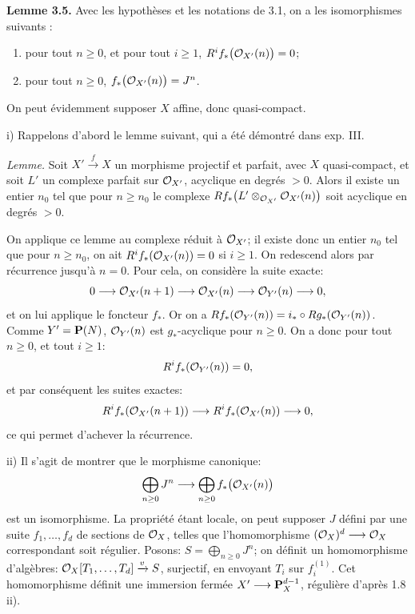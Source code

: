 \textbf{Lemme 3.5.} Avec les hypothèses et les notations de 3.1, on a les isomorphismes suivants :
\begin{enumerate}[label=\roman*)]
\item pour tout \(n\ge0\), et pour tout \(i\ge1\), \(R^if_*\bigl(\mathcal O_{X'}(n)\bigr)=0\);
\item pour tout \(n\ge0\), \(f_*\bigl(\mathcal O_{X'}(n)\bigr)=J^n\).
\end{enumerate}
On peut évidemment supposer \(X\) affine, donc quasi-compact.

i) Rappelons d'abord le lemme suivant, qui a été démontré dans exp. III.

\textit{Lemme.} Soit \(X'\xrightarrow{f}X\) un morphisme projectif et parfait, avec \(X\) quasi-compact, et soit \(L'\) un complexe parfait sur \(\mathcal O_{X'}\), acyclique en degrés \(>0\). Alors il existe un entier \(n_0\) tel que pour \(n\ge n_0\) le complexe \(Rf_*\bigl(L'\otimes_{\mathcal O_{X'}}\mathcal O_{X'}(n)\bigr)\) soit acyclique en degrés \(>0\).

On applique ce lemme au complexe réduit à \(\mathcal O_{X'}\); il existe donc un entier \(n_0\) tel que pour \(n\ge n_0\), on ait \(R^if_*(\mathcal O_{X'}(n))=0\) si \(i\ge1\). On redescend alors par récurrence jusqu'à \(n=0\). Pour cela, on considère la suite exacte:
\[
0\longrightarrow
\mathcal O_{X'}(n+1)
\longrightarrow
\mathcal O_{X'}(n)
\longrightarrow
\mathcal O_{Y'}(n)
\longrightarrow0,
\]
et on lui applique le foncteur \(f_*\). Or on a \(Rf_*(\mathcal O_{Y'}(n))=i_*\circ Rg_*(\mathcal O_{Y'}(n))\). Comme \(Y'=\mathbf P(N)\), \(\mathcal O_{Y'}(n)\) est \(g_*\)-acyclique pour \(n\ge0\). On a donc pour tout \(n\ge0\), et tout \(i\ge1\):
\[
R^if_*(\mathcal O_{Y'}(n))=0,
\]
et par conséquent les suites exactes:
\[
R^if_*(\mathcal O_{X'}(n+1))
\longrightarrow
R^if_*(\mathcal O_{X'}(n))
\longrightarrow0,
\]
ce qui permet d'achever la récurrence.

ii) Il s'agit de montrer que le morphisme canonique:
\[
\bigoplus_{n\ge0}J^n
\longrightarrow
\bigoplus_{n\ge0}f_*\bigl(\mathcal O_{X'}(n)\bigr)
\]
est un isomorphisme. La propriété étant locale, on peut supposer \(J\) défini par une suite \(f_1,\ldots,f_d\) de sections de \(\mathcal O_X\), telles que l'homomorphisme \((\mathcal O_X)^d\longrightarrow\mathcal O_X\) correspondant soit régulier. Posons: \(S=\bigoplus_{n\ge0}J^n\); on définit un homomorphisme d'algèbres: \(\mathcal O_X[T_1,\ldots,T_d]\xrightarrow{v}S\), surjectif, en envoyant \(T_i\) sur \(f_i^{(1)}\). Cet
homomorphisme définit une immersion fermée \(X'\longrightarrow\mathbf P_X^{d-1}\), régulière d'après 1.8 ii).

